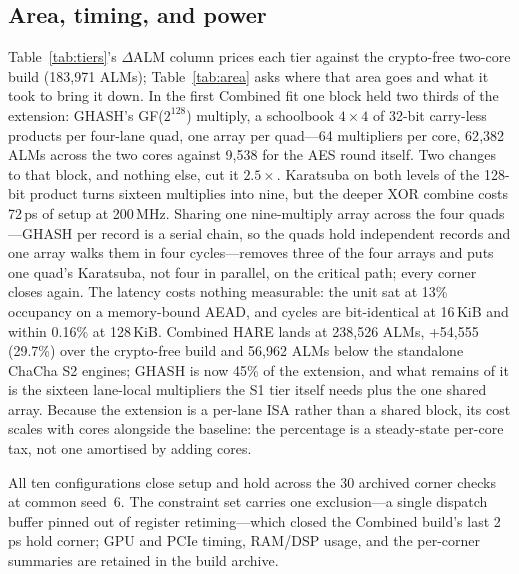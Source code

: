 \documentclass[conference]{IEEEtran}
\begin{document}
\subsection{Area, timing, and power}
\begin{table}[t]
\centering
\caption{Where the extension's area goes (Combined build, two cores, shared
GHASH) and what the three GHASH multiplier implementations cost.
Percentages in the upper block are of the extension's $\Delta$ALM; in the
lower, of the crypto-free core. Slack is the worst Vortex-domain entry over
the 30 corner checks; cycles are AES-GCM S3\,/\,4 at the board
configuration relative to the schoolbook build.}
\label{tab:area}
\scriptsize
\setlength{\tabcolsep}{2.5pt}

\end{table}
Table~\ref{tab:tiers}'s $\Delta$ALM column prices each tier against the
crypto-free two-core build (183{,}971 ALMs); Table~\ref{tab:area} asks where
that area goes and what it took to bring it down.
In the first Combined fit one block held two thirds of the extension:
GHASH's GF($2^{128}$) multiply, a schoolbook $4{\times}4$ of 32-bit
carry-less products per four-lane quad, one array per quad---64 multipliers
per core, 62{,}382 ALMs across the two cores against 9{,}538 for the AES
round itself. Two changes to that block, and nothing else, cut it
$2.5\times$. Karatsuba on both levels of the 128-bit product turns sixteen
multiplies into nine, but the deeper XOR combine costs 72\,ps of setup at
200\,MHz. Sharing one nine-multiply array across the four quads---GHASH per
record is a serial chain, so the quads hold independent records and one
array walks them in four cycles---removes three of the four arrays and puts
one quad's Karatsuba, not four in parallel, on the critical path; every
corner closes again. The latency costs nothing measurable: the unit sat at
13\% occupancy on a memory-bound AEAD, and cycles are bit-identical at
16\,KiB and within 0.16\% at 128\,KiB. Combined HARE lands at 238{,}526
ALMs, +54{,}555 (29.7\%) over the crypto-free build and 56{,}962 ALMs
below the standalone ChaCha S2 engines;
GHASH is now 45\% of the extension, and what remains of it is the sixteen
lane-local multipliers the S1 tier itself needs plus the one shared array.
Because the extension is a per-lane ISA rather than a shared block, its
cost scales with cores alongside the baseline: the percentage is a
steady-state per-core tax, not one amortised by adding cores.

All ten configurations close setup and hold across the 30 archived corner
checks at common seed~6. The constraint set carries one exclusion---a
single dispatch buffer pinned out of register retiming---which closed the
Combined build's last 2\,ps hold corner; GPU and PCIe timing, RAM/DSP
usage, and the per-corner summaries are retained in the build archive.
\end{document}
